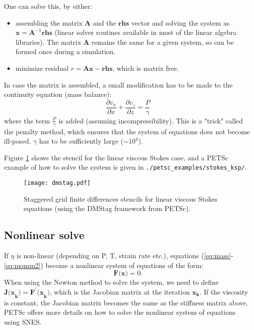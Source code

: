 \documentclass[a4paper,11pt]{article}
\begin{document}
One can solve this, by either:
\begin{itemize} 
\item assembling the matrix $\textbf{A}$ and the $\textbf{rhs}$ vector and solving the system as $\textbf{x} = \textbf{A}^{-1}\textbf{rhs}$ (linear solver routines available in most of the linear algebra libraries). The matrix $\textbf{A}$ remains the same for a given system, so can be formed once during a simulation. 
\item minimize residual $r = \textbf{A} \textbf{x} - \textbf{rhs}$, which is matrix free.
\end{itemize}

In case the matrix is assembled, a small modification has to be made to the continuity equation (mass balance):
\begin{equation}
\frac{\displaystyle \partial v_x}{\displaystyle \partial x}+\frac{\displaystyle \partial v_z}{\displaystyle \partial z} = \frac{\displaystyle P}{\displaystyle \gamma}
\end{equation}
where the term $\frac{P}{\gamma}$ is added (assuming incompressibility). This is a "trick" called the penalty method, which ensures that the system of equations does not become ill-posed. $\gamma$ has to be sufficiently large ($\sim 10^4$).

Figure \ref{fig:stokes_ksp} shows the stencil for the linear viscous Stokes case, and a PETSc example of how to solve the system is given in \texttt{./petsc\_examples/stokes\_ksp/}.

\begin{figure}
\begin{center}
\noindent \texttt{[image: dmstag.pdf]} 
\caption{Staggered grid finite differences stencils for linear viscous Stokes equations (using the DMStag framework from PETSc).}
\label{fig:stokes_ksp}
  \end{center}
\end{figure}

\subsection{Nonlinear solve}
If $\eta$ is non-linear (depending on P, T, strain rate etc.), equations (\ref{eq:mass}-\ref{eq:momm2}) become a nonlinear system of equations of the form:
\begin{equation}
\textbf{F(x)} = 0.
\end{equation}
When using the Newton method to solve the system, we need to define $\textbf{J(x}_\textbf{k}) = \textbf{F}^\prime\textbf{(x}_\textbf{k})$, which is the Jacobian matrix at the iteration $\textbf{x}_\textbf{k}$. If the viscosity is constant, the Jacobian matrix becomes the same as the stiffness matrix above. PETSc offers more details on how to solve the nonlinear system of equations using SNES.
\end{document}
